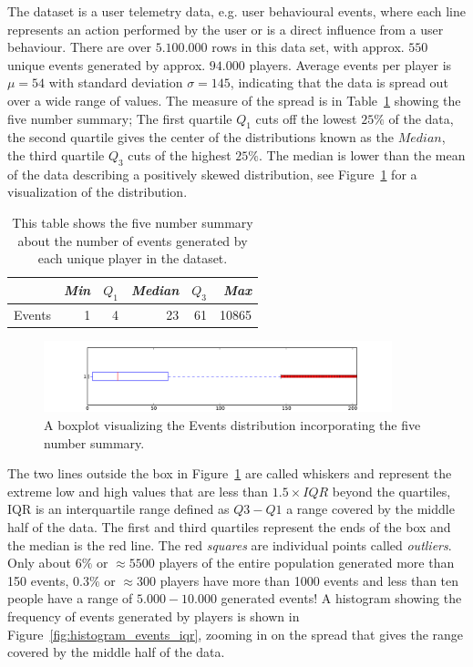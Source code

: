 The dataset is a user telemetry data, e.g. user behavioural events, where each line represents an action performed by the user or is a direct influence from a user behaviour. There are over $5.100.000$ rows in this data set, with approx. $550$ unique events generated by approx. $94.000$ players. Average events per player is $\mu = 54$ with standard deviation $\sigma = 145$, indicating that the data is spread out over a wide range of values. The measure of the spread is in Table~\ref{tab:FiveSummaryEvents} showing the five number summary; The first quartile $Q_1$ cuts off the lowest $25\%$ of the data, the second quartile gives the center of the distributions known as the $Median$, the third quartile $Q_3$ cuts of the highest $25\%$. The median is lower than the mean of the data describing a positively skewed distribution, see Figure~\ref{fig:boxplot_events} for a visualization of the distribution.

\begin{table}[h]
\centering
\begin{tabular}{| l | r | r | r | r | r |}
    \hline
    & \textit{Min} & $Q_1$ & \textit{Median} & $Q_3$ & \textit{Max} \\ \hline
    Events & 1 & 4 & 23 & 61 & 10865 \\ \hline
\end{tabular}
\caption{This table shows the five number summary about the number of events generated by each unique player in the dataset.}
\label{tab:FiveSummaryEvents}
\end{table}


\begin{figure}[here]
\centerline{\includegraphics[width=0.9\textwidth]{Figures/boxplot_events.pdf}}
\caption{A boxplot visualizing the Events distribution incorporating the five number summary.}
\label{fig:boxplot_events}
\end{figure}

The two lines outside the box in Figure~\ref{fig:boxplot_events} are called whiskers and represent the extreme low and high values that are less than $1.5 \times IQR$ beyond the quartiles, IQR is an interquartile range defined as $Q3 - Q1$ a range covered by the middle half of the data. The first and third quartiles represent the ends of the box and the median is the red line. The red \textit{squares} are individual points called \textit{outliers}. Only about $6\%$ or $\approx 5500$ players of the entire population generated more than 150 events, $0.3\%$ or $\approx300$ players have more than 1000 events and less than ten people have a range of $5.000-10.000$ generated events! A histogram showing the frequency of events generated by players is shown in Figure~\ref{fig:histogram_events_iqr}, zooming in on the spread that gives the range covered by the middle half of the data.

